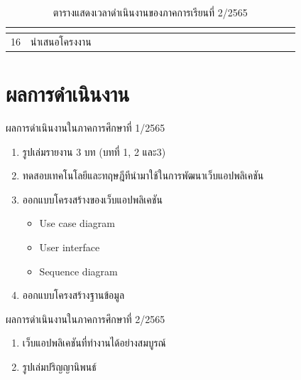 \documentclass[12pt,oneside,openright,a4paper]{cpe-thai-project}
\begin{document}
\begin{table}[!ht]
{\begin{tabular}{|llllllllllllllllllllll|}
      \multicolumn{1}{l|}{} &
      \multicolumn{1}{l|}{} &
      \multicolumn{1}{l|}{} &
      \multicolumn{1}{l|}{} &
      \multicolumn{1}{l|}{} &
      \multicolumn{1}{l|}{} &
      \multicolumn{1}{l|}{} &
      \multicolumn{1}{l|}{} &
      \multicolumn{1}{l|}{\cellcolor[HTML]{FFCE93}} &
      \multicolumn{1}{l|}{\cellcolor[HTML]{FFCE93}} &
      \multicolumn{1}{l|}{\cellcolor[HTML]{FFCE93}} &
      \multicolumn{1}{l|}{\cellcolor[HTML]{FFCE93}} &
      \multicolumn{1}{l|}{\cellcolor[HTML]{FFCE93}} &
      \multicolumn{1}{l|}{\cellcolor[HTML]{FFCE93}} &
      \multicolumn{1}{l|}{\cellcolor[HTML]{FFCE93}} &
      \multicolumn{1}{l|}{\cellcolor[HTML]{FFCE93}} &
      \multicolumn{1}{l|}{} &
      \multicolumn{1}{l|}{} &
      \multicolumn{1}{l|}{} &
       \\ \hline
    \multicolumn{1}{|l|}{16} &
      \multicolumn{1}{l|}{นำเสนอโครงงาน} &
      \multicolumn{1}{l|}{} &
      \multicolumn{1}{l|}{} &
      \multicolumn{1}{l|}{} &
      \multicolumn{1}{l|}{} &
      \multicolumn{1}{l|}{} &
      \multicolumn{1}{l|}{} &
      \multicolumn{1}{l|}{} &
      \multicolumn{1}{l|}{} &
      \multicolumn{1}{l|}{} &
      \multicolumn{1}{l|}{} &
      \multicolumn{1}{l|}{} &
      \multicolumn{1}{l|}{} &
      \multicolumn{1}{l|}{} &
      \multicolumn{1}{l|}{} &
      \multicolumn{1}{l|}{} &
      \multicolumn{1}{l|}{\cellcolor[HTML]{FFCE93}} &
      \multicolumn{1}{l|}{} &
      \multicolumn{1}{l|}{} &
      \multicolumn{1}{l|}{} &
       \\ \hline
    \end{tabular} %
    }
    \caption{\centering  ตารางแสดงเวลาดำเนินงานของภาคการเรียนที่ 2/2565} \label{tbl:working2}
\end{table}
\newpage
\section{ผลการดำเนินงาน}
ผลการดำเนินงานในภาคการศึกษาที่ 1/2565
\begin{enumerate}
  \item รูปเล่มรายงาน 3 บท (บทที่ 1, 2 และ3)
  \item ทดสอบเทคโนโลยีและทฤษฎีทีนำมาใช้ในการพัฒนาเว็บแอปพลิเคชัน
  \item ออกแบบโครงสร้างของเว็บแอปพลิเคชัน
    \begin {itemize}
        \item Use case diagram
        \item User interface
        \item Sequence diagram
    \end {itemize}
  \item ออกแบบโครงสร้างฐานข้อมูล
\end{enumerate}
ผลการดำเนินงานในภาคการศึกษาที่ 2/2565
\begin{enumerate}
  \item เว็บแอปพลิเคชันที่ทำงานได้อย่างสมบูรณ์
  \item รูปเล่มปริญญานิพนธ์
\end{enumerate}
\end{document}
